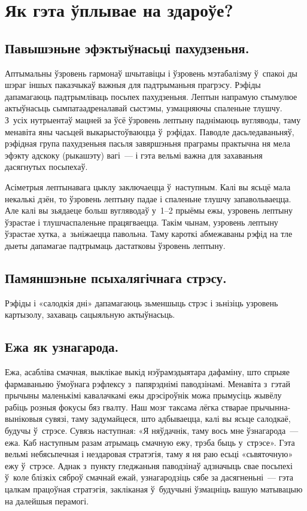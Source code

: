 \section{Як гэта ўплывае на здароўе?}

\subsection{Павышэньне эфэктыўнасьці пахудзеньня.}
Аптымальны ўзровень гармонаў шчытавіцы і ўзровень мэтабалізму ў~спакоі ды шэраг іншых паказчыкаў важныя для падтрыманьня прагрэсу. Рэфіды дапамагаюць падтрымліваць посьпех пахудзеньня. Лептын напрамую стымулюе актыўнасьць сымпатаадреналавай сыстэмы, узмацняючы спаленьне тлушчу. З~усіх нутрыентаў мацней за ўсё ўзровень лептыну паднімаюць вугляводы, таму менавіта яны часьцей выкарыстоўваюцца ў~рэфідах. Паводле дасьледаваньняў, рэфідная група пахудзеньня пасьля завяршэньня праграмы практычна ня мела эфэкту адскоку (рыкашэту) вагі~--- і гэта вельмі важна для захаваньня дасягнутых посьпехаў.

Асіметрыя лептынавага цыклу заключаецца ў~наступным. Калі вы ясьцё мала некалькі дзён, то ўзровень лептыну падае і спаленьне тлушчу запавольваецца. Але калі вы зьядаеце больш вугляводаў у~1--2 прыёмы ежы, узровень лептыну ўзрастае і тлушчаспаленьне працягваецца. Такім чынам, узровень лептыну ўзрастае хутка, а~зьніжаецца павольна. Таму кароткі абмежаваны рэфід на тле дыеты дапамагае падтрымаць дастатковы ўзровень лептыну.

\subsection{Памяншэньне псыхалягічнага стрэсу.}
Рэфіды і «салодкія дні» дапамагаюць зьменшыць стрэс і зьнізіць узровень картызолу, захаваць сацыяльную актыўнасьць.

\subsection{Ежа як узнагарода.}
Ежа, асабліва смачная, выклікае выкід нэўрамэдыятара дафаміну, што спрыяе фармаваньню ўмоўнага рэфлексу з~папярэднімі паводзінамі. Менавіта з~гэтай прычыны маленькімі кавалачкамі ежы дрэсіроўнік можа прымусіць жывёлу рабіць розныя фокусы бяз гвалту. Наш мозг таксама лёгка стварае прычынна-выніковыя сувязі, таму задумайцеся, што адбываецца, калі вы ясьце салодкаё, будучы ў~стрэсе. Сувязь наступная: «Я няўдачнік, таму вось мне ўзнагарода~--- ежа. Каб наступным разам атрымаць смачную ежу, трэба быць у~стрэсе». Гэта вельмі небясьпечная і нездаровая стратэгія, таму я ня раю есьці «сьвяточную» ежу ў~стрэсе. Аднак з~пункту гледжаньня паводзінаў адзначыць свае посьпехі ў~коле блізкіх сяброў смачнай ежай, узнагародзіць сябе за дасягненьні~--- гэта цалкам працоўная стратэгія, закліканая ў~будучыні ўзмацніць вашую матывацыю на далейшыя перамогі.

